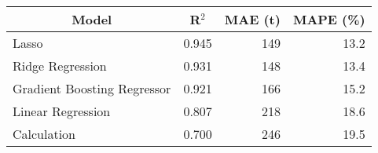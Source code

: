 
\begin{tabular}[t]{lrrr}
\toprule
\multicolumn{1}{c}{Model} & \multicolumn{1}{c}{R$^2$} & \multicolumn{1}{c}{MAE (t)} & \multicolumn{1}{c}{MAPE (\%)}\\
\midrule
Lasso & 0.945 & 149 & 13.2\\
Ridge Regression & 0.931 & 148 & 13.4\\
Gradient Boosting Regressor & 0.921 & 166 & 15.2\\
Linear Regression & 0.807 & 218 & 18.6\\
Calculation & 0.700 & 246 & 19.5\\
\bottomrule
\end{tabular}
